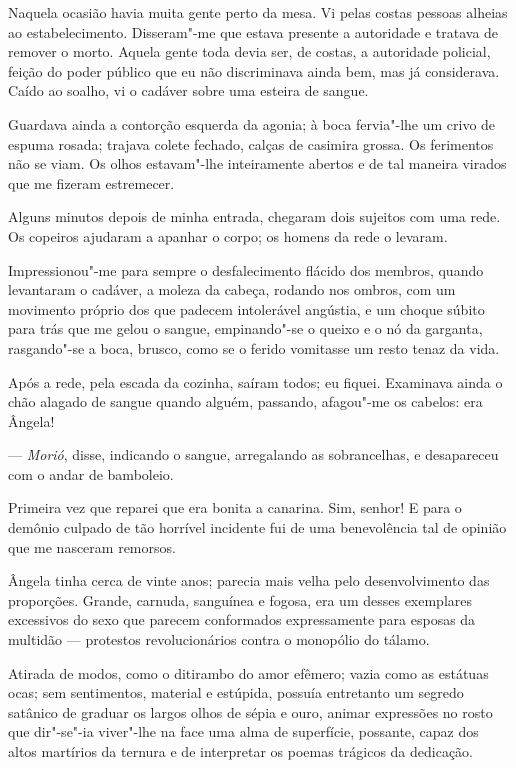 Naquela ocasião havia muita gente perto da
mesa. Vi pelas costas pessoas alheias ao estabelecimento. Disseram"-me
que estava presente a autoridade e tratava de remover o morto. Aquela
gente toda devia ser, de costas, a autoridade policial, feição do poder
público que eu não discriminava ainda bem, mas já considerava. Caído ao
soalho, vi o cadáver sobre uma esteira de sangue. 

Guardava ainda a
contorção esquerda da agonia; à boca fervia"-lhe um crivo de espuma
rosada; trajava colete fechado, calças de casimira grossa. Os
ferimentos não se viam. Os olhos estavam"-lhe inteiramente abertos e
de tal maneira virados que me fizeram estremecer. 

Alguns minutos depois
de minha entrada, chegaram dois sujeitos com uma rede. Os copeiros
ajudaram a apanhar o corpo; os homens da rede o levaram.

Impressionou"-me para sempre o desfalecimento flácido dos membros,
quando levantaram o cadáver, a moleza da cabeça, rodando nos ombros,
com um movimento próprio dos que padecem intolerável angústia, e um
choque súbito para trás que me gelou o sangue, empinando"-se o queixo
e o nó da garganta, rasgando"-se a boca, brusco, como se o ferido
vomitasse um resto tenaz da vida. 

Após a rede, pela escada da cozinha,
saíram todos; eu fiquei. Examinava ainda o chão alagado de sangue
quando alguém, passando, afagou"-me os cabelos: era Ângela! 

--- \textit{Morió}, disse, indicando o sangue, arregalando as sobrancelhas, e desapareceu
com o andar de bamboleio. 

Primeira vez que reparei que era bonita a
canarina. Sim, senhor! E para o demônio culpado de tão horrível
incidente fui de uma benevolência tal de opinião que me nasceram
remorsos. 

Ângela tinha cerca de vinte anos; parecia mais velha pelo
desenvolvimento das proporções. Grande, carnuda, sanguínea e fogosa,
era um desses exemplares excessivos do sexo que parecem conformados
expressamente para esposas da multidão --- protestos revolucionários
contra o monopólio do tálamo. 

Atirada de modos, como o ditirambo do
amor efêmero; vazia como as estátuas ocas; sem sentimentos, material e
estúpida, possuía entretanto um segredo satânico de graduar os largos
olhos de sépia e ouro, animar expressões no rosto que dir"-se"-ia
viver"-lhe na face uma alma de superfície, possante, capaz dos altos
martírios da ternura e de interpretar os poemas trágicos da dedicação.

